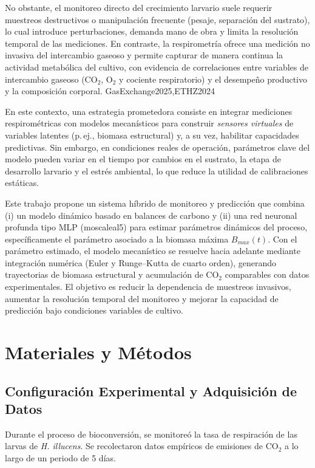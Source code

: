No obstante, el monitoreo directo del crecimiento larvario suele requerir muestreos destructivos o manipulación frecuente (pesaje, separación del sustrato), lo cual introduce perturbaciones, demanda mano de obra y limita la resolución temporal de las mediciones. En contraste, la respirometría ofrece una medición no invasiva del intercambio gaseoso y permite capturar de manera continua la actividad metabólica del cultivo, con evidencia de correlaciones entre variables de intercambio gaseoso (CO$_2$, O$_2$ y cociente respiratorio) y el desempeño productivo y la composición corporal. GasExchange2025,ETHZ2024

En este contexto, una estrategia prometedora consiste en integrar mediciones respirométricas con modelos mecanísticos para construir \textit{sensores virtuales} de variables latentes (p.\,ej., biomasa estructural) y, a su vez, habilitar capacidades predictivas. Sin embargo, en condiciones reales de operación, parámetros clave del modelo pueden variar en el tiempo por cambios en el sustrato, la etapa de desarrollo larvario y el estrés ambiental, lo que reduce la utilidad de calibraciones estáticas. \cite{eriksenDynamicModellingFeed2022}

Este trabajo propone un sistema híbrido de monitoreo y predicción que combina (i) un modelo dinámico basado en balances de carbono y (ii) una red neuronal profunda tipo MLP (moscaleal5) para estimar parámetros dinámicos del proceso, específicamente el parámetro asociado a la biomasa máxima $B_{max}(t)$. Con el parámetro estimado, el modelo mecanístico se resuelve hacia adelante mediante integración numérica (Euler y Runge--Kutta de cuarto orden), generando trayectorias de biomasa estructural y acumulación de CO$_2$ comparables con datos experimentales. El objetivo es reducir la dependencia de muestreos invasivos, aumentar la resolución temporal del monitoreo y mejorar la capacidad de predicción bajo condiciones variables de cultivo.

\section{Materiales y Métodos}

\subsection{Configuración Experimental y Adquisición de Datos}
Durante el proceso de bioconversión, se monitoreó la tasa de respiración de las larvas de \textit{H. illucens}. Se recolectaron datos empíricos de emisiones de CO$_2$ a lo largo de un periodo de 5 días. \cite{adadiPeekingBlackBoxSurvey2018}

